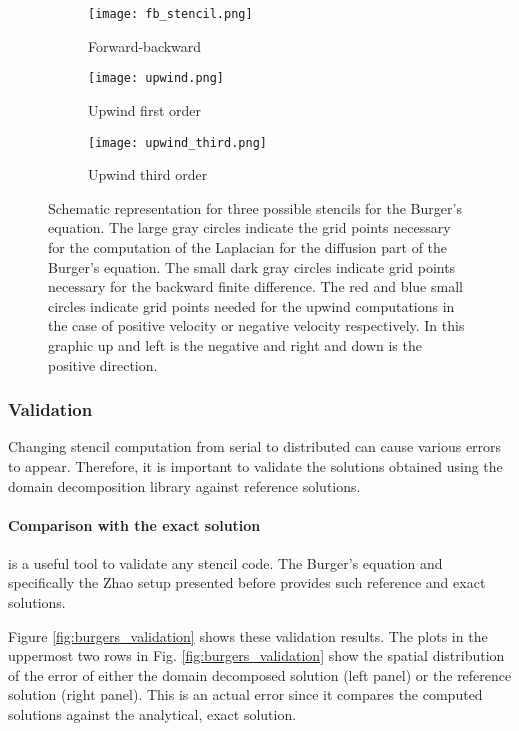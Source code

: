 \begin{figure}[!htbp]
\centering
\begin{subfigure}{.3\textwidth}
  \centering
  \texttt{[image: fb\_stencil.png]}
  \caption{Forward-backward}
  \label{fig:fb_stencil}
\end{subfigure}%
\begin{subfigure}{.3\textwidth}
  \centering
  \texttt{[image: upwind.png]}
  \caption{Upwind first order}
  \label{fig:upwind_stencil}
\end{subfigure}
\begin{subfigure}{.3\textwidth}
  \centering
  \texttt{[image: upwind\_third.png]}
  \caption{Upwind third order}
  \label{fig:upwind_third_stencil}
\end{subfigure}
\caption{Schematic representation for three possible stencils for the Burger's equation. The large gray circles indicate the grid points necessary for the computation of the Laplacian for the diffusion part of the Burger's equation. The small dark gray circles indicate grid points necessary for the backward finite difference. The red and blue small circles indicate grid points needed for the upwind computations in the case of positive velocity or negative velocity respectively. In this graphic up and left is the negative and right and down is the positive direction.}
\label{fig:burger_stencils}
\end{figure}

\subsubsection{Validation}
Changing stencil computation from serial to distributed can cause various errors to appear.
Therefore, it is important to validate the solutions obtained using the domain decomposition library against reference solutions.

\paragraph{Comparison with the exact solution} is a useful tool to validate any stencil code.
The Burger's equation and specifically the Zhao setup presented before provides such reference and exact solutions.

Figure \ref{fig:burgers_validation} shows these validation results. The plots in the uppermost two rows in Fig. \ref{fig:burgers_validation} show the spatial distribution of the error of either the domain decomposed solution (left panel) or the reference solution (right panel).
This is an actual error since it compares the computed solutions against the analytical, exact solution.

